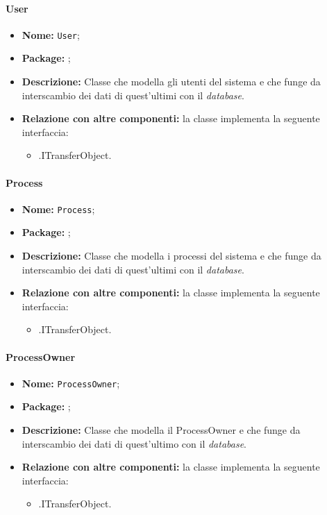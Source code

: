 \paragraph{User}
\begin{itemize}
\item \textbf{Nome:} \texttt{User};
\item \textbf{Package:} \texttt{\smodel{}};
\item \textbf{Descrizione:} Classe che modella gli utenti del sistema e che funge da interscambio dei dati di quest'ultimi con il \textit{database}.
\item \textbf{Relazione con altre componenti:} la classe implementa la seguente interfaccia:
		\begin{itemize}
			\item \smodel{}.ITransferObject.
		\end{itemize}
\end{itemize}

\paragraph{Process}
\begin{itemize}
\item \textbf{Nome:} \texttt{Process};
\item \textbf{Package:} \texttt{\smodel{}};
\item \textbf{Descrizione:} Classe che modella i processi del sistema e che funge da interscambio dei dati di quest'ultimi con il \textit{database}.
\item \textbf{Relazione con altre componenti:} la classe implementa la seguente interfaccia:
		\begin{itemize}
			\item \smodel{}.ITransferObject.
		\end{itemize}
\end{itemize}

\paragraph{ProcessOwner}
\begin{itemize}
\item \textbf{Nome:} \texttt{ProcessOwner};
\item \textbf{Package:} \texttt{\smodel{}};
\item \textbf{Descrizione:} Classe che modella il ProcessOwner e che funge da interscambio dei dati di quest'ultimo con il \textit{database}.
\item \textbf{Relazione con altre componenti:} la classe implementa la seguente interfaccia:
		\begin{itemize}
			\item \smodel{}.ITransferObject.
		\end{itemize}
\end{itemize}

